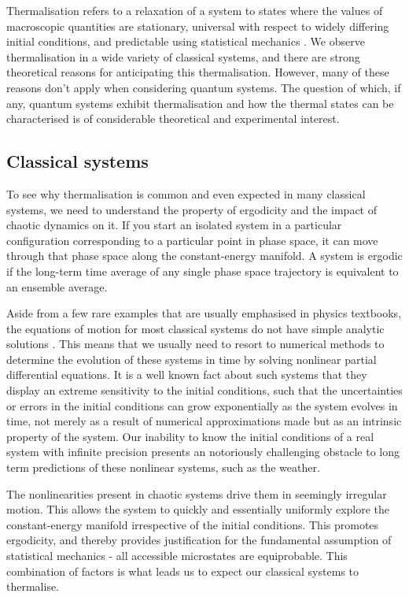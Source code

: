 \documentclass[a4paper, 10pt]{article}
\theoremstyle{plain}
\begin{document}
Thermalisation refers to a relaxation of a system to states where the values
of macroscopic quantities are stationary, universal with respect to widely
differing initial conditions, and predictable using statistical mechanics
\cite{Rigol2008}. We observe thermalisation in a wide variety of classical
systems, and there are strong theoretical reasons for anticipating this
thermalisation. However, many of these reasons don't apply when considering
quantum systems. The question of which, if any, quantum systems exhibit
thermalisation and how the thermal states can be characterised is of
considerable theoretical and experimental interest.

\subsection{Classical systems}

To see why thermalisation is common and even expected in many classical
systems, we need to understand the property of ergodicity and the impact of
chaotic dynamics on it. If you start an isolated system in a particular
configuration corresponding to a particular point in phase space, it can move
through that phase space along the constant-energy manifold. A system is
ergodic if the long-term time average of any single phase space trajectory
is equivalent to an ensemble average. 

Aside from a few rare examples that are usually emphasised in physics textbooks,
the equations of motion for most classical systems do not have simple analytic
solutions \cite{Jensen1992}. This means that we usually need to resort to
numerical methods to determine the evolution of these systems in time by solving
nonlinear partial differential equations. It is a well known fact about such
systems that they display an extreme sensitivity to the initial conditions, such
that the uncertainties or errors in the initial conditions can grow
exponentially as the system evolves in time, not merely as a result of numerical
approximations made but as an intrinsic property of the system. Our inability to
know the initial conditions of a real system with infinite precision presents an notoriously
challenging obstacle to long term predictions of these nonlinear systems, such
as the weather.

The nonlinearities present in chaotic systems drive them in seemingly irregular
motion. This allows the system to quickly and essentially uniformly explore the
constant-energy manifold irrespective of the initial conditions. This promotes
ergodicity, and thereby provides justification for the fundamental assumption
of statistical mechanics - all accessible microstates are equiprobable.
This combination of factors is what leads us to expect
our classical systems to thermalise.
\end{document}
